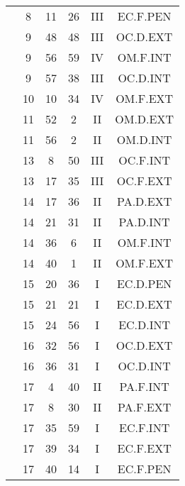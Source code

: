 \documentclass[12pt, a4paper]{article}
\begin{document}
\begin{multicols}{3}
{\begin{tabular}{c c c c c c}
	 	 	 	 & 8 & 11 & 26 & III & EC.F.PEN\\%
	 	 	 	 & 9 & 48 & 48 & III & OC.D.EXT\\%
	 	 	 	 & 9 & 56 & 59 & IV & OM.F.INT\\%
	 	 	 	 & 9 & 57 & 38 & III & OC.D.INT\\%
	 	 	 	 & 10 & 10 & 34 & IV & OM.F.EXT\\%
	 	 	 	 & 11 & 52 & 2 & II & OM.D.EXT\\%
	 	 	 	 & 11 & 56 & 2 & II & OM.D.INT\\%
	 	 	 	 & 13 & 8 & 50 & III & OC.F.INT\\%
	 	 	 	 & 13 & 17 & 35 & III & OC.F.EXT\\%
	 	 	 	 & 14 & 17 & 36 & II & PA.D.EXT\\%
	 	 	 	 & 14 & 21 & 31 & II & PA.D.INT\\%
	 	 	 	 & 14 & 36 & 6 & II & OM.F.INT\\%
	 	 	 	 & 14 & 40 & 1 & II & OM.F.EXT\\%
	 	 	 	 & 15 & 20 & 36 & I & EC.D.PEN\\%
	 	 	 	 & 15 & 21 & 21 & I & EC.D.EXT\\%
	 	 	 	 & 15 & 24 & 56 & I & EC.D.INT\\%
	 	 	 	 & 16 & 32 & 56 & I & OC.D.EXT\\%
	 	 	 	 & 16 & 36 & 31 & I & OC.D.INT\\%
	 	 	 	 & 17 & 4 & 40 & II & PA.F.INT\\%
	 	 	 	 & 17 & 8 & 30 & II & PA.F.EXT\\%
	 	 	 	 & 17 & 35 & 59 & I & EC.F.INT\\%
	 	 	 	 & 17 & 39 & 34 & I & EC.F.EXT\\%
	 	 	 	 & 17 & 40 & 14 & I & EC.F.PEN\\%

\end{tabular}}
\end{multicols}
\end{document}
